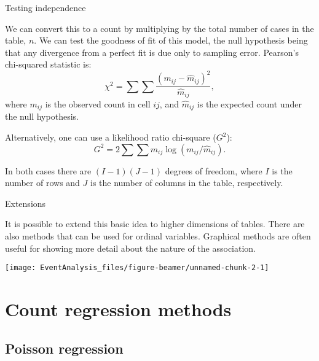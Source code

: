 \documentclass[10pt,ignorenonframetext,]{beamer}
\begin{document}
\begin{frame}{Testing independence}

We can convert this to a count by multiplying by the total number of
cases in the table, \(n.\) We can test the goodness of fit of this
model, the null hypothesis being that any divergence from a perfect fit
is due only to sampling error. Pearson's chi-squared statistic is: \[
\chi^2 = \sum\sum \frac{(m_{ij} - \hat{m}_{ij})^2}{\hat{m}_{ij}},
\] where \(m_{ij}\) is the observed count in cell \(ij\), and
\(\hat{m}_{ij}\) is the expected count under the null hypothesis.

Alternatively, one can use a likelihood ratio chi-square (\(G^2\)): \[
G^2 = 2 \sum\sum m_{ij} \log (m_{ij}/\hat{m}_{ij}).
\]

In both cases there are \((I-1)(J-1)\) degrees of freedom, where \(I\)
is the number of rows and \(J\) is the number of columns in the table,
respectively.

\end{frame}

\begin{frame}{Extensions}

It is possible to extend this basic idea to higher dimensions of tables.
There are also methods that can be used for ordinal variables. Graphical
methods are often useful for showing more detail about the nature of the
association.

\begin{center}\texttt{[image: EventAnalysis\_files/figure-beamer/unnamed-chunk-2-1]} \end{center}

\end{frame}

\section{Count regression methods}\label{count-regression-methods}

\subsection{Poisson regression}\label{poisson-regression}
\end{document}
